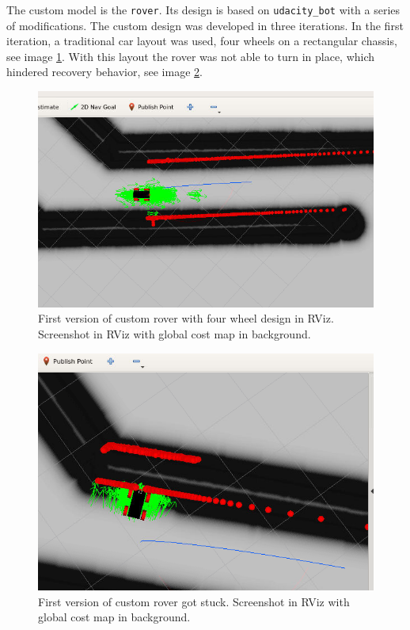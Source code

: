 \documentclass[10pt,journal,compsoc]{IEEEtran}
\begin{document}
The custom model is the \texttt{rover}. Its design is based on \texttt{udacity\_bot} with a series of modifications. The custom design was developed in three iterations. In the first iteration, a traditional car layout was used, four wheels on a rectangular chassis, see image \ref{fig:rover_1_design}. With this layout the rover was not able to turn in place, which hindered recovery behavior, see image \ref{fig:rover_1_stuck}.
\begin{figure}[thpb]
      \centering
      \includegraphics[width=\columnwidth]{images/rover_version_1_1_small.png}
      \caption{First version of custom rover with four wheel design in RViz. Screenshot in RViz with global cost map in background.}
      \label{fig:rover_1_design}
\end{figure}
\begin{figure}[thpb]
      \centering
      \includegraphics[width=\columnwidth]{images/rover_version_1_5_small.png}
      \caption{First version of custom rover got stuck. Screenshot in RViz with global cost map in background.}
      \label{fig:rover_1_stuck}
\end{figure}
\end{document}
